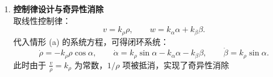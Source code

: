 \documentclass[../main.tex]{subfiles}
\begin{document}
\begin{enumerate}
\begin{itemize}
{\begin{enumerate}
\begin{itemize}
\[\begin{bmatrix}
                                    \end{bmatrix}
                                    \begin{bmatrix}
                                        v \\[2pt] w
                                    \end{bmatrix},
                                    \qquad
                                    \text{在 } \rho = 0 \text{ 处存在奇异性}\footnote{\small\kaishu
                                    奇异性来源于 $\tfrac{\sin\alpha}{\rho}$ 项：当 $\rho \to 0$ 时除零导致方程不可定义，产生数值不稳定；
                                    实际表现为控制器在目标点附近振荡或发散。
                                    为消除奇异性，通常令 $v=k_\rho \rho$，
                                    使得 $\tfrac{v}{\rho}=k_\rho$ 成常数，从而闭环系统不再含 $1/\rho$，在 $\rho \to 0$ 时仍连续可微。}
                                    \]
                                \end{itemize}
                            
                                \item \textbf{控制律设计与奇异性消除}\\
                                取线性控制律：
                                \[
                                v = k_\rho \rho, \qquad w = k_\alpha \alpha + k_\beta \beta.
                                \]
                                代入情形 (a) 的系统方程，可得闭环系统：
                                \[
                                \dot{\rho} = -k_\rho \rho \cos\alpha, \qquad
                                \dot{\alpha} = k_\rho \sin\alpha - k_\alpha \alpha - k_\beta \beta, \qquad
                                \dot{\beta} = k_\rho \sin\alpha.
                                \]
                                此时由于 $\tfrac{v}{\rho}=k_\rho$ 为常数，$1/\rho$ 项被抵消，实现了奇异性消除
                            \end{enumerate}
                            }

                        \end{itemize}
            \end{enumerate}
\end{document}
